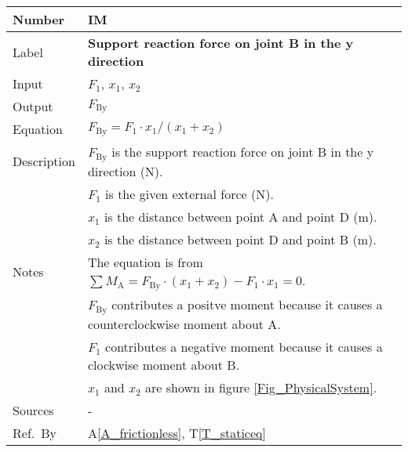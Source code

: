 \documentclass[12pt]{article}
\newcommand{\colAwidth}{0.13\textwidth}
\newcommand{\colBwidth}{0.82\textwidth}
\newcommand{\tref}[1]{T\ref{#1}}
\newcommand{\aref}[1]{A\ref{#1}}
\newcounter{instnum} %
\begin{document}
\noindent
\begin{minipage}{\textwidth}
	\renewcommand*{\arraystretch}{1.5}
	\begin{tabular}{| p{\colAwidth} | p{\colBwidth}|}
		\hline
		\rowcolor[gray]{0.9}
		Number& IM{instnum}\theinstnum \label{I_solveFby}\\
		\hline
		Label& \bf Support reaction force on joint B in the y direction\\
		\hline
		Input& $F_\text{1}$, $x_\text{1}$, $x_\text{2}$ \\
		\hline
		Output& $F_{\text{{By}}}$ \\
		\hline
		Equation& $F_{\text{By}} = F_\text{1} \cdot x_\text{1} / (x_\text{1} + 
		x_\text{2})$ \\
		\hline
		Description&$F_{\text{By}}$ is the support reaction force on joint B in 
		the y direction (N).\\
		&$F_1$ is the given external force (N).\\
		&$x_1$ is the distance between point A and point D (m).\\
		&$x_2$ is the distance between point D and point B (m).\\
		\hline
		Notes&The equation is from $\sum M_{\text{A}} = F_{\text{By}} \cdot 
		(x_\text{1} + x_\text{2}) - F_\text{1} \cdot x_\text{1} = 0$. \\
		& $F_{\text{By}}$ contributes a positve moment because it causes a 
		counterclockwise moment about A.\\
		& $F_1$ contributes a negative moment because it causes a clockwise 
		moment 
		about B.\\
		&$x_1$ and $x_2$ are shown in figure \ref{Fig_PhysicalSystem}. \\
		\hline
		Sources& - \\
		\hline
		Ref.\ By & \aref{A_frictionless}, \tref{T_staticeq} \\
		\hline
	\end{tabular}
\end{minipage}\\

~\newline
\end{document}
